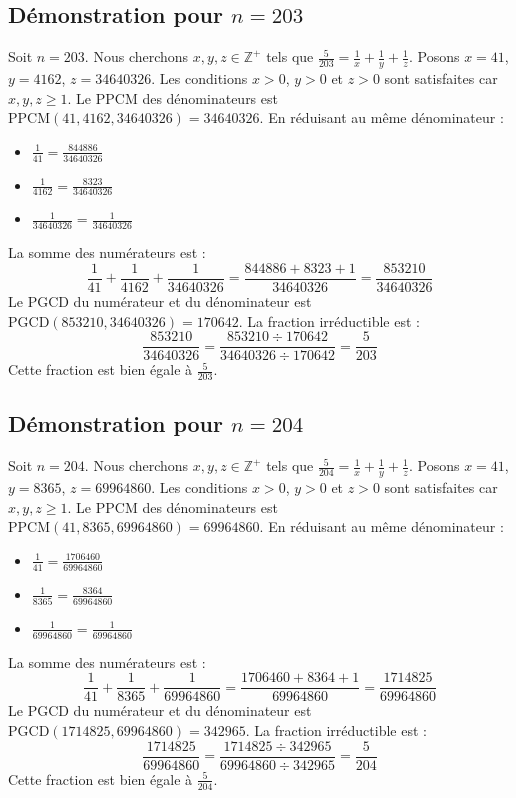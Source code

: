 \documentclass[11pt,a4paper]{article}
\begin{document}
\subsection{Démonstration pour $n = 203$}
Soit $n = 203$. Nous cherchons $x, y, z \in \mathbb{Z}^{+}$ tels que $\frac{5}{203} = \frac{1}{x} + \frac{1}{y} + \frac{1}{z}$.
Posons $x = 41$, $y = 4162$, $z = 34640326$.
Les conditions $x > 0$, $y > 0$ et $z > 0$ sont satisfaites car $x, y, z \geq 1$.
Le PPCM des dénominateurs est $\text{PPCM}(41, 4162, 34640326) = 34640326$.
En réduisant au même dénominateur :
\begin{itemize}
    \item $\frac{1}{41} = \frac{844886}{34640326}$
    \item $\frac{1}{4162} = \frac{8323}{34640326}$
    \item $\frac{1}{34640326} = \frac{1}{34640326}$
\end{itemize}
La somme des numérateurs est :
$$ \frac{1}{41} + \frac{1}{4162} + \frac{1}{34640326} = \frac{844886 + 8323 + 1}{34640326} = \frac{853210}{34640326} $$
Le PGCD du numérateur et du dénominateur est $\text{PGCD}(853210, 34640326) = 170642$.
La fraction irréductible est :
$$ \frac{853210}{34640326} = \frac{853210 \div 170642}{34640326 \div 170642} = \frac{5}{203} $$
Cette fraction est bien égale à $\frac{5}{203}$.

\subsection{Démonstration pour $n = 204$}
Soit $n = 204$. Nous cherchons $x, y, z \in \mathbb{Z}^{+}$ tels que $\frac{5}{204} = \frac{1}{x} + \frac{1}{y} + \frac{1}{z}$.
Posons $x = 41$, $y = 8365$, $z = 69964860$.
Les conditions $x > 0$, $y > 0$ et $z > 0$ sont satisfaites car $x, y, z \geq 1$.
Le PPCM des dénominateurs est $\text{PPCM}(41, 8365, 69964860) = 69964860$.
En réduisant au même dénominateur :
\begin{itemize}
    \item $\frac{1}{41} = \frac{1706460}{69964860}$
    \item $\frac{1}{8365} = \frac{8364}{69964860}$
    \item $\frac{1}{69964860} = \frac{1}{69964860}$
\end{itemize}
La somme des numérateurs est :
$$ \frac{1}{41} + \frac{1}{8365} + \frac{1}{69964860} = \frac{1706460 + 8364 + 1}{69964860} = \frac{1714825}{69964860} $$
Le PGCD du numérateur et du dénominateur est $\text{PGCD}(1714825, 69964860) = 342965$.
La fraction irréductible est :
$$ \frac{1714825}{69964860} = \frac{1714825 \div 342965}{69964860 \div 342965} = \frac{5}{204} $$
Cette fraction est bien égale à $\frac{5}{204}$.
\end{document}
